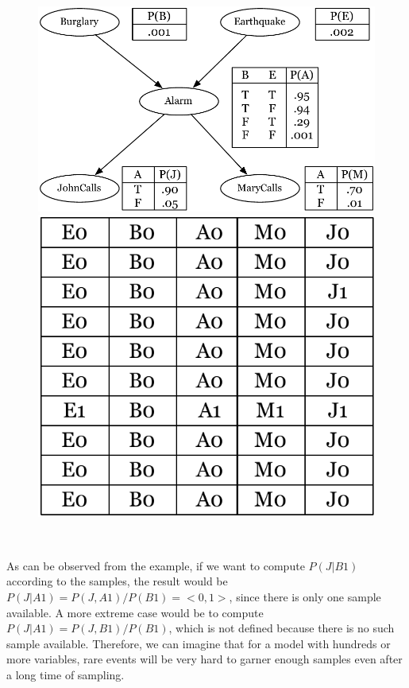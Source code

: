 \documentclass[twoside]{article}
\begin{document}
\begin{figure}[H]
\begin{center}
\includegraphics[scale=0.5]{alarm_example}
\end{center}
\endminipage\hfill
{}
\begin{center}
\includegraphics[scale=0.5]{alarm_table}
\end{center} 
\endminipage\hfill \\
\end{figure}
As can be observed from the example, if we want to compute $P(J|B1)$ according to the samples, the result would be $P(J|A1) = P(J,A1)/P(B1)= <0,1>$, since there is only one sample available. A more extreme case would be to compute $P(J|A1)=P(J,B1)/P(B1)$, which is not defined because there is no such sample available. Therefore, we can imagine that for a model with hundreds or more variables, rare events will be very hard to garner enough samples even after a long time of sampling.
\end{document}
